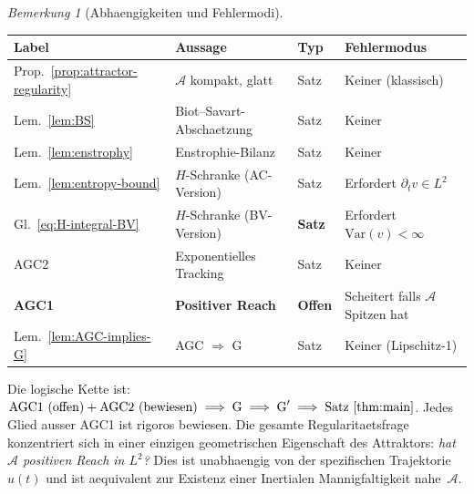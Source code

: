 \documentclass[12pt,a4paper]{article}
\theoremstyle{definition}
\theoremstyle{plain}
\theoremstyle{remark}
\newtheorem{remark}[definition]{Bemerkung}
\begin{document}
\begin{remark}[Abhaengigkeiten und Fehlermodi]\label{rem:dependencies}
\mbox{}

\begin{center}
\begin{tabular}{llll}
\hline
\textbf{Label} & \textbf{Aussage} & \textbf{Typ} & \textbf{Fehlermodus} \\
\hline
Prop.~\ref{prop:attractor-regularity} &
  $\mathcal{A}$ kompakt, glatt &
  Satz & Keiner (klassisch) \\
Lem.~\ref{lem:BS} &
  Biot--Savart-Abschaetzung &
  Satz & Keiner \\
Lem.~\ref{lem:enstrophy} &
  Enstrophie-Bilanz &
  Satz & Keiner \\
Lem.~\ref{lem:entropy-bound} &
  $H$-Schranke (AC-Version) &
  Satz & Erfordert $\partial_t v \in L^2$ \\
Gl.~\eqref{eq:H-integral-BV} &
  $H$-Schranke (BV-Version) &
  \textbf{Satz} & Erfordert $\mathrm{Var}(v) < \infty$ \\
AGC2 &
  Exponentielles Tracking &
  Satz & Keiner~\cite{Temam2001} \\
\textbf{AGC1} &
  \textbf{Positiver Reach} &
  \textbf{Offen} &
  Scheitert falls $\mathcal{A}$ Spitzen hat \\
Lem.~\ref{lem:AGC-implies-G} &
  AGC $\Rightarrow$ G &
  Satz & Keiner (Lipschitz-1) \\
\hline
\end{tabular}
\end{center}

\medskip\noindent
Die logische Kette ist:
$\textup{AGC1 (offen)} + \textup{AGC2 (bewiesen)}
\;\Longrightarrow\;
\textup{G}
\;\Longrightarrow\;
\textup{G}'
\;\Longrightarrow\;
\textup{Satz~\ref{thm:main}}$.
Jedes Glied ausser AGC1 ist rigoros bewiesen. Die gesamte Regularitaetsfrage
konzentriert sich in einer einzigen geometrischen Eigenschaft des
Attraktors: \emph{hat $\mathcal{A}$ positiven Reach in $L^2$?}
Dies ist unabhaengig von der spezifischen Trajektorie~$u(t)$ und ist
aequivalent zur Existenz einer Inertialen Mannigfaltigkeit nahe~$\mathcal{A}$.
\end{remark}
\end{document}
